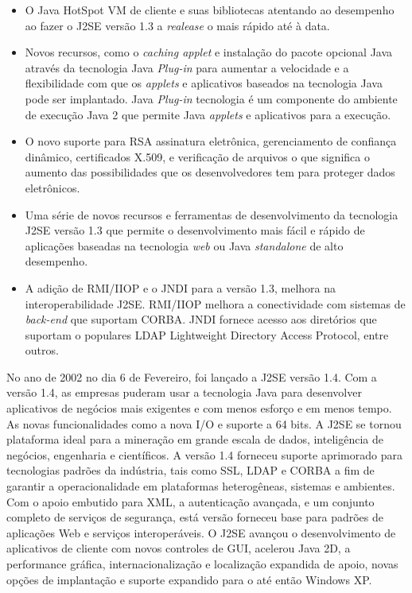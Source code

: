 \begin{itemize}
  \item O Java HotSpot VM de cliente e suas bibliotecas atentando ao desempenho ao fazer o J2SE versão 1.3 a {\it realease} o mais rápido até à data.
  \item Novos recursos, como o {\it caching applet} e instalação do pacote opcional Java através da tecnologia Java {\it  Plug-in} para aumentar a velocidade e a flexibilidade com que os {\it applets} e aplicativos baseados na tecnologia Java pode ser implantado. Java {\it  Plug-in} tecnologia é um componente do ambiente de execução Java 2 que permite Java {\it applets} e aplicativos para a execução.
  \item O novo suporte para \acs{RSA} assinatura eletrônica, gerenciamento de confiança dinâmico, certificados X.509, e verificação de arquivos o que significa o aumento das possibilidades que os desenvolvedores tem para proteger dados eletrônicos.
  \item Uma série de novos recursos e ferramentas de desenvolvimento da tecnologia J2SE versão 1.3 que permite o desenvolvimento mais fácil e rápido de aplicações baseadas na tecnologia {\it web} ou Java {\it  standalone} de alto desempenho.
  \item A adição de RMI/IIOP e o JNDI para a versão 1.3, melhora na interoperabilidade J2SE. RMI/IIOP melhora a conectividade com sistemas de {\it  back-end} que suportam CORBA. JNDI fornece acesso aos diretórios que suportam o populares LDAP Lightweight Directory Access Protocol, entre outros.
\end{itemize}

No ano de 2002 no dia 6 de Fevereiro, foi lançado a J2SE versão 1.4. Com a versão 1.4, as empresas puderam usar a tecnologia Java para desenvolver aplicativos de negócios mais exigentes e com menos esforço e em menos tempo. As novas funcionalidades como a nova I/O e suporte a 64 bits. A J2SE se tornou plataforma ideal para a mineração em grande escala de dados, inteligência de negócios, engenharia e científicos. A versão 1.4 forneceu suporte aprimorado para tecnologias padrões da indústria, tais como SSL, LDAP e CORBA a fim de garantir a operacionalidade em plataformas heterogêneas, sistemas e ambientes. Com o apoio embutido para XML, a autenticação avançada, e um conjunto completo de serviços de segurança, está versão forneceu base para padrões de aplicações Web e serviços interoperáveis. O J2SE avançou o desenvolvimento de aplicativos de cliente com novos controles de GUI, acelerou Java 2D, a performance gráfica, internacionalização e localização expandida de apoio, novas opções de implantação e suporte expandido para o até então Windows XP.\\

